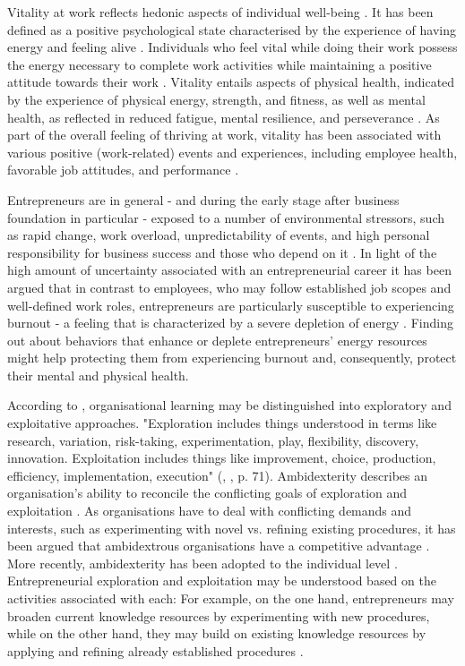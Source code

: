 \documentclass[man, 12pt, a4paper, noextraspace]{apa6}
\begin{document}
Vitality at work reflects hedonic aspects of individual well-being \parencite{Ryan.2000c}.
It has been defined as a positive psychological state characterised by the experience of having energy \parencite{Nix.1999b} and feeling alive \parencite{Spreitzer.2005b}. 
Individuals who feel vital while doing their work possess the energy necessary to complete work activities while maintaining a positive attitude towards their work \parencite{Ryan.1997}. 
Vitality entails aspects of physical health, indicated by the experience of physical energy, strength, and fitness, as well as mental health, as reflected in reduced fatigue, mental resilience, and perseverance \parencite{Ryan.1997, Shirom.2010}. 
As part of the overall feeling of thriving at work, vitality has been associated with various positive (work‐related) events and experiences, including employee health, favorable job attitudes, and performance \parencite{Kleine.2019}. \par 
Entrepreneurs are in general - and during the early stage after business foundation in particular - exposed to a number of environmental stressors, such as rapid change, work overload, unpredictability of events, and high personal responsibility for business success and those who depend on it \parencite{DeMol2018}.  
In light of the high amount of uncertainty associated with an entrepreneurial career it has been argued that in contrast to employees, who may follow established job scopes and well-defined work roles, entrepreneurs are particularly susceptible to experiencing burnout \parencite[e.g.,][]{Wincent2008, Wincent2009a, DeMol2018} - a feeling that is characterized by a severe depletion of energy \parencite{Maslach.1981}. 
Finding out about behaviors that enhance or deplete entrepreneurs' energy resources might help protecting them from experiencing burnout and, consequently, protect their mental and physical health. \par 
According to \textcite{March.1991}, organisational learning may be distinguished into exploratory and exploitative approaches. 
"Exploration  includes  things  understood  in  terms like research, variation, risk-taking, experimentation, play, flexibility, discovery, innovation. Exploitation includes things like improvement, choice, production, efficiency, implementation, execution" (\citeauthor{March.1991}, \citeyear{March.1991}, p. 71).
Ambidexterity describes an organisation's ability to reconcile the conflicting goals of exploration and exploitation \parencite{March.1991}. 
As organisations have to deal with conflicting demands and interests, such as experimenting with novel vs. refining existing procedures, it has been argued that ambidextrous organisations have a competitive advantage \parencite[e.g.,][]{Gibson2004, Tushman1996}.
More recently, ambidexterity has been adopted to the individual level \parencite{Mom.2007, Good.2013}.
Entrepreneurial exploration and exploitation may be understood based on the activities associated with each: For example, on the one hand, entrepreneurs may broaden current knowledge resources by experimenting with new procedures, while on the other hand, they may build on existing knowledge resources by applying and refining already established procedures \parencite[e.g.,][]{Volery.2015}.
\end{document}

